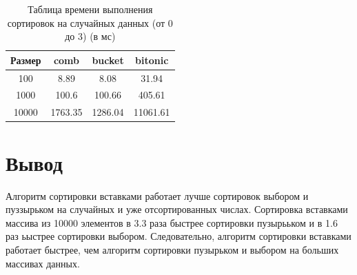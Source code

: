 \documentclass[12pt]{report}
\begin{document}
	\begin{table} [h!]
		\caption{Таблица времени выполнения сортировок на случайных данных (от 0 до 3) (в мс)}
		\begin{center}
			\begin{tabular}{|c | c | c | c|}
				
				\hline
				
				Размер & comb & bucket & bitonic  \\ [0.5ex]
				
				\hline
				
				100 & 8.89 & 8.08 & 31.94 \\ 
				
				\hline 
				
				1000 & 100.6 & 100.66 & 405.61 \\ 
				
				\hline 
				
				10000 & 1763.35 & 1286.04 & 11061.61 \\ 
				
				\hline 
				
			\end{tabular}
		\end{center}
	\end{table}
	
	\begin{center}
	\end{center}
	

	\section{Вывод}
	
	Алгоритм сортировки вставками работает лучше сортировок выбором и пуззырьком на случайных и уже отсортированных числах. Сортировка вставками массива из 10000 элементов в 3.3 раза быстрее сортировки пузырььком и в 1.6 раз ьыстрее сортировки выбором. Следовательно, алгоритм сортировки вставками работает быстрее, чем алгоритм сортировки пузырьком и выбором на больших массивах данных.
	
\end{document}

